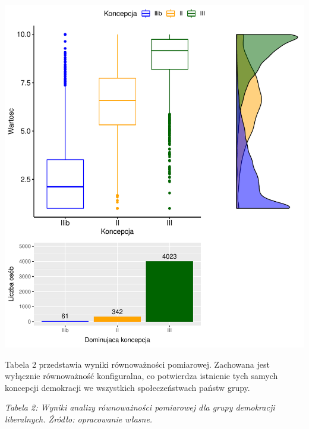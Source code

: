 \documentclass[12pt]{article}
\begin{document}
\begin{center}\includegraphics{text_ASA_files/figure-latex/stats-west-1} \end{center}

Tabela 2 przedstawia wyniki równoważności pomiarowej. Zachowana jest wyłącznie równoważność konfiguralna, co potwierdza istnienie tych samych koncepcji demokracji we wszystkich społeczeństwach państw grupy.

\emph{Tabela 2: Wyniki analizy równoważności pomiarowej dla grupy demokracji liberalnych. Źródło: opracowanie własne.}

\begin{table}[H]
\centering
{}
\end{table}
\end{document}
